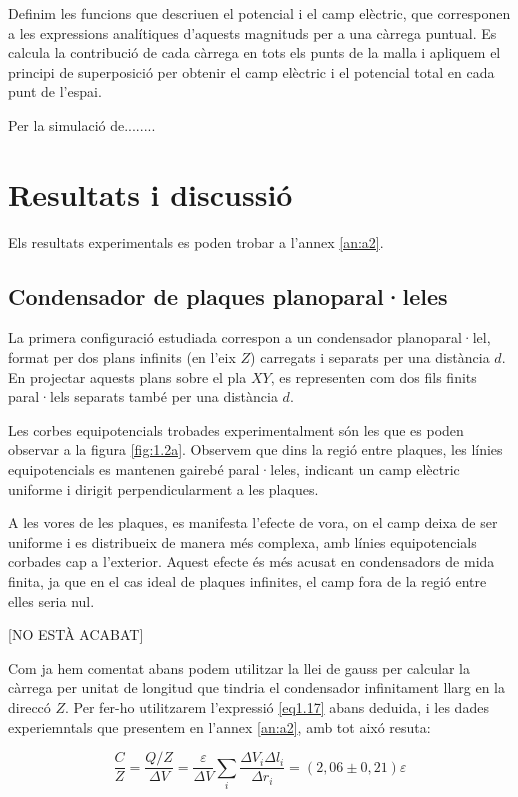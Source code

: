 \documentclass[a4paper,10.5pt]{report}
\begin{document}
Definim les funcions que descriuen el potencial i el camp elèctric, que corresponen a les expressions analítiques d'aquests magnituds per a una càrrega puntual. Es calcula la contribució de cada càrrega en tots els punts de la malla i  apliquem el principi de superposició per obtenir el camp elèctric i el potencial total en cada punt de l’espai.

Per la simulació de........

\section{Resultats i discussió}
Els resultats experimentals es poden trobar a l'annex \ref{an:a2}.

\subsection{Condensador de plaques planoparal·leles}
La primera configuració estudiada correspon a un condensador planoparal·lel, format per dos plans infinits (en l'eix $Z$) carregats i separats per una distància $d$. En projectar aquests plans sobre el pla $XY$, es representen com dos fils finits paral·lels separats també per una distància $d$. 

Les corbes equipotencials trobades experimentalment són les que es poden observar a la figura \ref{fig:1.2a}. Observem que dins la regió entre plaques, les línies equipotencials es mantenen gairebé paral·leles, indicant un camp elèctric uniforme i dirigit perpendicularment a les plaques. 

A les vores de les plaques, es manifesta l’efecte de vora, on el camp deixa de ser uniforme i es distribueix de manera més complexa, amb línies equipotencials corbades cap a l’exterior. Aquest efecte és més acusat en condensadors de mida finita, ja que en el cas ideal de plaques infinites, el camp fora de la regió entre elles seria nul. 

[NO ESTÀ ACABAT]

Com ja hem comentat abans podem utilitzar la llei de gauss per calcular la càrrega per unitat de longitud que tindria el condensador infinitament llarg en la direccó $Z$. Per fer-ho utilitzarem l'expressió \eqref{eq1.17} abans deduida, i les dades experiemntals que presentem en l'annex \ref{an:a2}, amb tot aixó resuta:

\begin{equation}
	\frac{C}{Z} = \frac{Q/Z}{\Delta V} = \frac{\varepsilon}{\Delta V} \sum_i \frac{\Delta V_i \Delta l_i}{\Delta r_i} = (2,06 \pm 0,21)\varepsilon 
\end{equation}
\end{document}
